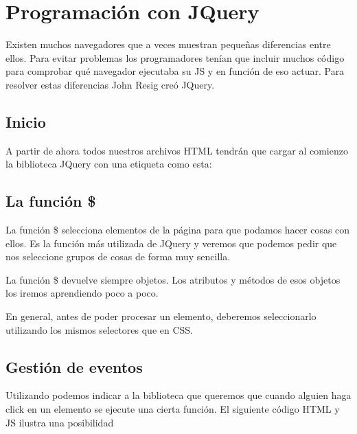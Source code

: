 \documentclass[letterpaper,10pt,spanish]{sphinxmanual}
\begin{document}
\section{Programación con JQuery}
\label{\detokenize{tema4:programacion-con-jquery}}
Existen muchos navegadores que a veces muestran pequeñas diferencias entre ellos. Para evitar problemas los programadores tenían que incluir muchos código para comprobar qué navegador ejecutaba su JS y en función de eso actuar. Para resolver estas diferencias John Resig creó JQuery.


\subsection{Inicio}
\label{\detokenize{tema4:inicio}}
A partir de ahora todos nuestros archivos HTML tendrán que cargar al comienzo la biblioteca JQuery con una etiqueta como esta:

\begin{sphinxVerbatim}[commandchars=\\\{\}]
  
  
\end{sphinxVerbatim}



\subsection{La función \$}
\label{\detokenize{tema4:la-funcion}}
La función \$ selecciona elementos de la página para que podamos hacer cosas con ellos. Es la función más utilizada de JQuery y veremos que podemos pedir que nos seleccione grupos de cosas de forma muy sencilla.

La función \$ devuelve siempre objetos. Los atributos y métodos de esos objetos los iremos aprendiendo poco a poco.

En general, antes de poder procesar un elemento, deberemos seleccionarlo utilizando los mismos selectores que en CSS.


\subsection{Gestión de eventos}
\label{\detokenize{tema4:gestion-de-eventos}}
Utilizando  podemos indicar a la biblioteca que queremos que cuando alguien haga click en un elemento se ejecute una cierta función. El siguiente código HTML y JS ilustra una posibilidad
\end{document}
